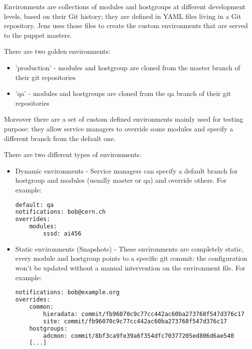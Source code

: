 Environments are collections of modules and hostgroups at different
development levels, based on their Git history; they are defined in YAML
files living in a Git repository. Jens uses those files to create the
custom environments that are served to the puppet masters.

There are two golden environments:

\begin{itemize}
    \item 'production' - modules and hostgroup are cloned from the master branch of
their git repositories
    \item 'qa' - modules and hostgroups are cloned from the qa branch of their git
repositories
\end{itemize}

Moreover there are a set of custom defined environments mainly used for
testing purpose: they allow service managers to override some modules and
specify a different branch from the default one.

There are two different types of environments:

\begin{itemize} 
    \item Dynamic environments - Service managers can specify a default branch for
hostgroup and modules (usually master or qa) and override others. For
example:

\begin{lstlisting}[language=bash, frame=single]
default: qa
notifications: bob@cern.ch
overrides:
    modules:
        sssd: ai456
\end{lstlisting}

    \item Static environments (Snapshots) - These environments are completely static,
every module and hostgroup points to a specific git commit: the
configuration won't be updated without a manual intervention on the
environment file. For example:

\begin{lstlisting}[language=bash, frame=single]
notifications: bob@example.org
overrides:
    common:
        hieradata: commit/fb96070c9c77cc442ac60ba273768f547d376c17
        site: commit/fb96070c9c77cc442ac60ba273768f547d376c17
    hostgroups:
        adcmon: commit/8bf3ca9fe39a6f354dfc70377205ed806d6ae540
    [...]
\end{lstlisting}
\end{itemize}
